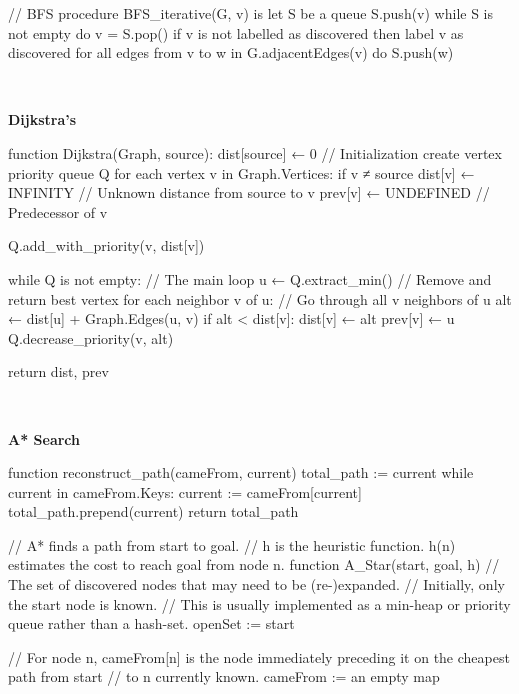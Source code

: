 \begin{FlushLeft}
\begin{pseudocode}
// BFS
procedure BFS_iterative(G, v) is
let S be a queue
S.push(v)
while S is not empty do
    v = S.pop()
    if v is not labelled as discovered then
        label v as discovered
        for all edges from v to w in G.adjacentEdges(v) do 
            S.push(w)
    \end{pseudocode} \\ \BK

    \textbf{Dijkstra's} \\
    \begin{pseudocode}
function Dijkstra(Graph, source):
    dist[source] ← 0                           // Initialization
    create vertex priority queue Q
    for each vertex v in Graph.Vertices:
        if v ≠ source
            dist[v] ← INFINITY                 // Unknown distance from source to v
            prev[v] ← UNDEFINED                // Predecessor of v

        Q.add_with_priority(v, dist[v])


    while Q is not empty:                      // The main loop
        u ← Q.extract_min()                    // Remove and return best vertex
        for each neighbor v of u:              // Go through all v neighbors of u
            alt ← dist[u] + Graph.Edges(u, v)
            if alt < dist[v]:
                dist[v] ← alt
                prev[v] ← u
                Q.decrease_priority(v, alt)

    return dist, prev
    \end{pseudocode} \\ \BK

    \textbf{A* Search} \\
    \begin{pseudocode}
function reconstruct_path(cameFrom, current)
    total_path := {current}
    while current in cameFrom.Keys:
        current := cameFrom[current]
        total_path.prepend(current)
    return total_path

// A* finds a path from start to goal.
// h is the heuristic function. h(n) estimates the cost to reach goal from node n.
function A_Star(start, goal, h)
    // The set of discovered nodes that may need to be (re-)expanded.
    // Initially, only the start node is known.
    // This is usually implemented as a min-heap or priority queue rather than a hash-set.
    openSet := {start}

    // For node n, cameFrom[n] is the node immediately preceding it on the cheapest path from start
    // to n currently known.
    cameFrom := an empty map


\end{pseudocode}
\end{FlushLeft}
